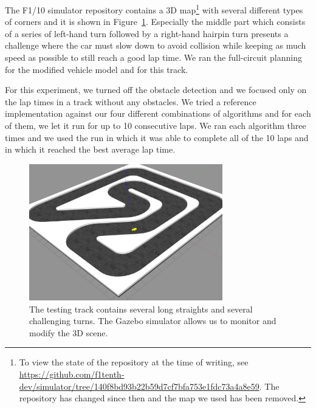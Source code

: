The F1/10 simulator repository contains a 3D map\footnote{To view the state of the repository at the time of writing, see \url{https://github.com/f1tenth-dev/simulator/tree/140f8bd93b22b59d7cf7bfa753e1fdc73a4a8e59}. The repository has changed since then and the map we used has been removed.} with several different types of corners and it is shown in Figure~\ref{fig:gazebo-track}. Especially the middle part which consists of a series of left-hand turn followed by a right-hand hairpin turn presents a challenge where the car must slow down to avoid collision while keeping as much speed as possible to still reach a good lap time. We ran the full-circuit planning for the modified vehicle model and for this track.

For this experiment, we turned off the obstacle detection and we focused only on the lap times in a track without any obstacles. We tried a reference implementation against our four different combinations of algorithms and for each of them, we let it run for up to 10 consecutive laps. We ran each algorithm three times and we used the run in which it was able to complete all of the 10 laps and in which it reached the best average lap time.

\begin{figure}
	\centering
	\includegraphics[width=0.75\textwidth]{../img/experiments/gazebo-track.png}
	\caption{The testing track contains several long straights and several challenging turns. The Gazebo simulator allows us to monitor and modify the 3D scene.}
	\label{fig:gazebo-track}
\end{figure}

